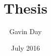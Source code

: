 \documentclass[11pt,a4paper,twoside,openright]{book}
\title{Thesis}
\author{Gavin Day}
\date{July 2016}
\begin{document}



\tableofcontents
\listoffigures
\listoftables

\pagestyle{fancy}

\fancyhf{}
\fancyhead[LE,RO]{\thepage}
\fancyhead[LO,RE]{\chaptermark }
%
%
%
%

\begin{appendices}
	

\end{appendices}
\pagebreak


\printbibliography
\end{document}
